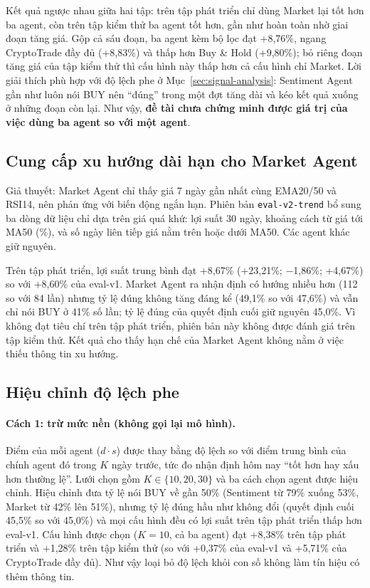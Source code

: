 Kết quả ngược nhau giữa hai tập: trên tập phát triển chỉ dùng Market lại tốt hơn ba agent, còn trên tập kiểm thử ba agent
tốt hơn, gần như hoàn toàn nhờ giai đoạn tăng giá. Gộp cả sáu đoạn, ba agent kèm bộ lọc đạt +8,76\%, ngang CryptoTrade
đầy đủ (+8,83\%) và thấp hơn Buy \& Hold (+9,80\%); bỏ riêng đoạn tăng giá của tập kiểm thử thì cấu hình này thấp hơn cả
cấu hình chỉ Market. Lời giải thích phù hợp với độ lệch phe ở Mục~\ref{sec:signal-analysis}: Sentiment Agent gần như luôn
nói BUY nên ``đúng'' trong một đợt tăng dài và kéo kết quả xuống ở những đoạn còn lại. Như vậy, \textbf{đề tài chưa chứng
minh được giá trị của việc dùng ba agent so với một agent}.

\subsection{Cung cấp xu hướng dài hạn cho Market Agent}
Giả thuyết: Market Agent chỉ thấy giá 7 ngày gần nhất cùng EMA20/50 và RSI14, nên phản ứng với biến động ngắn hạn. Phiên
bản \texttt{eval-v2-trend} bổ sung ba dòng dữ liệu chỉ dựa trên giá quá khứ: lợi suất 30 ngày, khoảng cách từ giá tới
MA50 (\%), và số ngày liên tiếp giá nằm trên hoặc dưới MA50. Các agent khác giữ nguyên.

Trên tập phát triển, lợi suất trung bình đạt +8,67\% (+23,21\%; $-$1,86\%; +4,67\%) so với +8,60\% của eval-v1. Market
Agent ra nhận định có hướng nhiều hơn (112 so với 84 lần) nhưng tỷ lệ đúng không tăng đáng kể (49,1\% so với 47,6\%) và
vẫn chỉ nói BUY ở 41\% số lần; tỷ lệ đúng của quyết định cuối giữ nguyên 45,0\%. Vì không đạt tiêu chí trên tập phát
triển, phiên bản này không được đánh giá trên tập kiểm thử. Kết quả cho thấy hạn chế của Market Agent không nằm ở việc
thiếu thông tin xu hướng.

\subsection{Hiệu chỉnh độ lệch phe}
\paragraph{Cách 1: trừ mức nền (không gọi lại mô hình).} Điểm của mỗi agent ($d\cdot s$) được thay bằng độ lệch so với
điểm trung bình của chính agent đó trong $K$ ngày trước, tức đo nhận định hôm nay ``tốt hơn hay xấu hơn thường lệ''.
Lưới chọn gồm $K\in\{10,20,30\}$ và ba cách chọn agent được hiệu chỉnh. Hiệu chỉnh đưa tỷ lệ nói BUY về gần 50\% (Sentiment
từ 79\% xuống 53\%, Market từ 42\% lên 51\%), nhưng tỷ lệ đúng hầu như không đổi (quyết định cuối 45,5\% so với 45,0\%) và
mọi cấu hình đều có lợi suất trên tập phát triển thấp hơn eval-v1. Cấu hình được chọn ($K=10$, cả ba agent) đạt +8,38\%
trên tập phát triển và +1,28\% trên tập kiểm thử (so với +0,37\% của eval-v1 và +5,71\% của CryptoTrade đầy đủ). Như vậy
loại bỏ độ lệch khỏi con số không làm tín hiệu có thêm thông tin.

